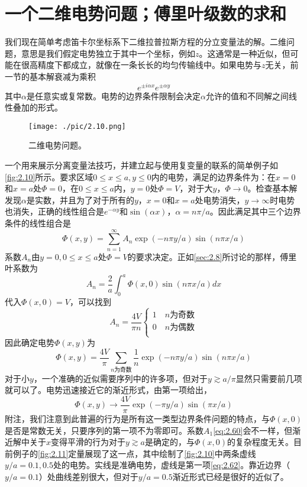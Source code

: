 \documentclass[12pt]{book}
\numberwithin{equation}{chapter}
\numberwithin{figure}{chapter}
\numberwithin{footnote}{page}
\begin{document}
\section{一个二维电势问题；傅里叶级数的求和}\label{sec:2.10}

我们现在简单考虑笛卡尔坐标系下二维拉普拉斯方程的分立变量法的解。二维问题，意思是我们假定电势独立于其中一个坐标，例如$z$。这通常是一种近似，但可能在很高精度下都成立，就像在一条长长的均匀传输线中。如果电势与$z$无关，前一节的基本解衰减为乘积
$$e^{\pm i\alpha x}e^{\pm \alpha y}$$
其中$\alpha$是任意实或复常数。电势的边界条件限制会决定$\alpha$允许的值和不同解之间线性叠加的形式。

\begin{figure}[!ht]
    \centering
    \texttt{[image: ./pic/2.10.png]}
    \captionsetup{justification=raggedright, singlelinecheck=false}
    \caption{二维电势问题。}
    \label{fig:2.10}
\end{figure}

一个用来展示分离变量法技巧，并建立起与使用复变量的联系的简单例子如\autoref{fig:2.10}所示。要求区域$0\leq x \leq a, y\leq 0$内的电势，满足的边界条件为：在$x=0$和$x=a$处$\Phi=0$，在$0\leq x\leq a$内，$y=0$处$\Phi=V$，对于大$y$，$\Phi\to 0$。检查基本解发现$\alpha$是实数，并且为了对于所有的$y$，$x=0$和$x=a$处电势消失，$y\to \infty$时电势也消失，正确的线性组合是$e^{-\alpha y}$和$\sin(\alpha x)$，$\alpha=n\pi/a$。因此满足其中三个边界条件的线性组合是
\begin{equation}\label{eq:2.59}
    \Phi(x,y)=\sum_{n=1}^\infty A_n \exp(-n\pi y/a)\sin(n\pi x/a)
\end{equation}
系数$A_n$由$y=0,0\leq x \leq a$处$\Phi=V$的要求决定。正如\autoref{sec:2.8}所讨论的那样，傅里叶系数为
\begin{equation}\label{eq:2.60}
    A_n=\frac{2}{a}\int_0^a \Phi(x,0) \sin(n\pi x/a) dx
\end{equation}
代入$\Phi(x,0)=V$，可以找到
$$
    A_n=\frac{4V}{\pi n}
    \begin{cases}
        1\quad n \mbox{为奇数}\\
        0\quad n \mbox{为偶数}\\
    \end{cases}
$$
因此确定电势$\Phi(x,y)$为
\begin{equation}\label{eq:2.61}
    \Phi(x,y)=\frac{4V}{\pi}\sum_{n\mbox{为奇数}}\frac{1}{n}\exp(-n\pi y/a)\sin(n\pi x/a)
\end{equation}
对于小$y$，一个准确的近似需要序列中的许多项，但对于$y\gtrsim a/\pi$显然只需要前几项就可以了。电势迅速接近它的渐近形式，由第一项给出，
\begin{equation}\label{eq:2.62}
    \Phi(x,y)\to \frac{4V}{\pi}\exp(-\pi y/a)\sin(\pi x/a)
\end{equation}
附注，我们注意到此普遍的行为是所有这一类型边界条件问题的特点，与$\Phi(x,0)$是否是常数无关，只要序列的第一项不为零即可。系数$A_1$\autoref{eq:2.60}会不一样，但渐近解中关于$x$变得平滑的行为对于$y\gtrsim a$是确定的，与$\Phi(x,0)$的复杂程度无关。目前例子的\autoref{fig:2.11}定量展现了这一点，其中绘制了\autoref{fig:2.10}中两条虚线$y/a=0.1,0.5$处的电势。实线是准确电势，虚线是第一项\autoref{eq:2.62}。靠近边界（$y/a=0.1$）处曲线差别很大，但对于$y/a=0.5$渐近形式已经是很好的近似了。
\end{document}
